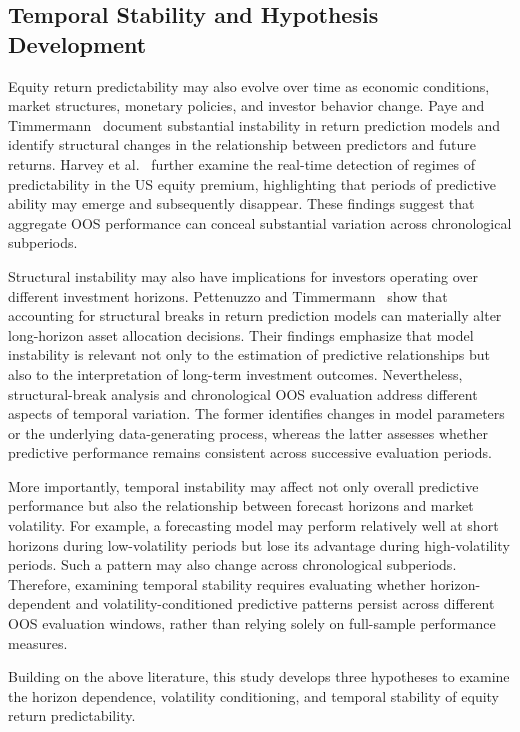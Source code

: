 \documentclass[runningheads,orivec]{llncs}
\begin{document}
\subsection{Temporal Stability and Hypothesis Development}

Equity return predictability may also evolve over time as economic conditions, market structures, monetary policies, and investor behavior change. Paye and Timmermann~\cite{paye2006} document substantial instability in return prediction models and identify structural changes in the relationship between predictors and future returns. Harvey et al.~\cite{harvey2021} further examine the real-time detection of regimes of predictability in the US equity premium, highlighting that periods of predictive ability may emerge and subsequently disappear. These findings suggest that aggregate OOS performance can conceal substantial variation across chronological subperiods.

Structural instability may also have implications for investors operating over different investment horizons. Pettenuzzo and Timmermann~\cite{pettenuzzo2011} show that accounting for structural breaks in return prediction models can materially alter long-horizon asset allocation decisions. Their findings emphasize that model instability is relevant not only to the estimation of predictive relationships but also to the interpretation of long-term investment outcomes. Nevertheless, structural-break analysis and chronological OOS evaluation address different aspects of temporal variation. The former identifies changes in model parameters or the underlying data-generating process, whereas the latter assesses whether predictive performance remains consistent across successive evaluation periods.

More importantly, temporal instability may affect not only overall predictive performance but also the relationship between forecast horizons and market volatility. For example, a forecasting model may perform relatively well at short horizons during low-volatility periods but lose its advantage during high-volatility periods. Such a pattern may also change across chronological subperiods. Therefore, examining temporal stability requires evaluating whether horizon-dependent and volatility-conditioned predictive patterns persist across different OOS evaluation windows, rather than relying solely on full-sample performance measures.

Building on the above literature, this study develops three hypotheses to examine the horizon dependence, volatility conditioning, and temporal stability of equity return predictability.
\end{document}
